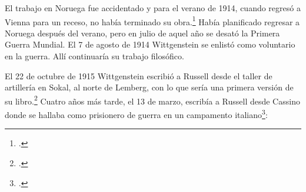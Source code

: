 El trabajo en Noruega fue accidentado y para el verano de 1914, cuando regresó a
Vienna para un receso, no había terminado su obra.\footcite[cap. 5 loc
2154]{monk} Había planificado regresar a Noruega después del verano, pero en julio de
aquel año se desató la Primera Guerra Mundial. El 7 de agosto de 1914
Wittgenstein se enlistó como voluntario en la guerra. Allí continuaría su 
trabajo filosófico. 

El 22 de octubre de 1915 Wittgenstein escribió a Russell
desde el taller de artillería en Sokal, al norte de Lemberg, con lo que sería
una primera versión de su libro.\footcite[cf. p.84]{cambridgeletters} Cuatro años más
tarde, el 13 de marzo, escribía a Russell desde Cassino donde se hallaba como
prisionero de guerra en un campamento italiano\footcite[cf. p.268]{mcguinness}:

